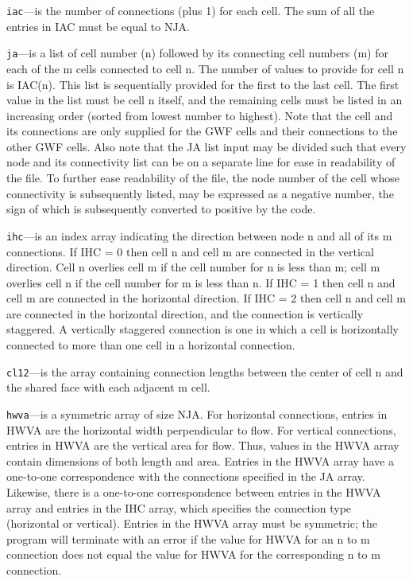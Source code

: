 \begin{description}
\item \texttt{iac}---is the number of connections (plus 1) for each cell.  The sum of all the entries in IAC must be equal to NJA.

\item \texttt{ja}---is a list of cell number (n) followed by its connecting cell numbers (m) for each of the m cells connected to cell n. The number of values to provide for cell n is IAC(n).  This list is sequentially provided for the first to the last cell. The first value in the list must be cell n itself, and the remaining cells must be listed in an increasing order (sorted from lowest number to highest).  Note that the cell and its connections are only supplied for the GWF cells and their connections to the other GWF cells.  Also note that the JA list input may be divided such that every node and its connectivity list can be on a separate line for ease in readability of the file. To further ease readability of the file, the node number of the cell whose connectivity is subsequently listed, may be expressed as a negative number, the sign of which is subsequently converted to positive by the code.

\item \texttt{ihc}---is an index array indicating the direction between node n and all of its m connections.  If IHC = 0 then cell n and cell m are connected in the vertical direction.  Cell n overlies cell m if the cell number for n is less than m; cell m overlies cell n if the cell number for m is less than n.  If IHC = 1 then cell n and cell m are connected in the horizontal direction.  If IHC = 2 then cell n and cell m are connected in the horizontal direction, and the connection is vertically staggered.  A vertically staggered connection is one in which a cell is horizontally connected to more than one cell in a horizontal connection.

\item \texttt{cl12}---is the array containing connection lengths between the center of cell n and the shared face with each adjacent m cell.

\item \texttt{hwva}---is a symmetric array of size NJA.  For horizontal connections, entries in HWVA are the horizontal width perpendicular to flow.  For vertical connections, entries in HWVA are the vertical area for flow.  Thus, values in the HWVA array contain dimensions of both length and area.  Entries in the HWVA array have a one-to-one correspondence with the connections specified in the JA array.  Likewise, there is a one-to-one correspondence between entries in the HWVA array and entries in the IHC array, which specifies the connection type (horizontal or vertical).  Entries in the HWVA array must be symmetric; the program will terminate with an error if the value for HWVA for an n to m connection does not equal the value for HWVA for the corresponding n to m connection.


\end{description}
